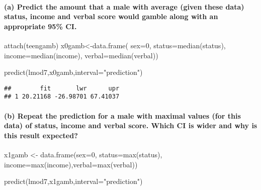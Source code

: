 \documentclass[
]{article}
\newenvironment{Shaded}{\begin{snugshade}}{\end{snugshade}}
\newcommand{\AttributeTok}[1]{\textcolor[rgb]{0.77,0.63,0.00}{#1}}
\newcommand{\DecValTok}[1]{\textcolor[rgb]{0.00,0.00,0.81}{#1}}
\newcommand{\FunctionTok}[1]{\textcolor[rgb]{0.00,0.00,0.00}{#1}}
\newcommand{\NormalTok}[1]{#1}
\newcommand{\OtherTok}[1]{\textcolor[rgb]{0.56,0.35,0.01}{#1}}
\newcommand{\StringTok}[1]{\textcolor[rgb]{0.31,0.60,0.02}{#1}}
\begin{document}
\hypertarget{a-predict-the-amount-that-a-male-with-average-given-these-data-status-income-and-verbal-score-would-gamble-along-with-an-appropriate-95-ci.}{%
\paragraph{(a) Predict the amount that a male with average (given these
data) status, income and verbal score would gamble along with an
appropriate 95\%
CI.}\label{a-predict-the-amount-that-a-male-with-average-given-these-data-status-income-and-verbal-score-would-gamble-along-with-an-appropriate-95-ci.}}

\begin{Shaded}
\begin{Highlighting}[]
\FunctionTok{attach}\NormalTok{(teengamb)}
\NormalTok{x0gamb}\OtherTok{\textless{}{-}}\FunctionTok{data.frame}\NormalTok{( }\AttributeTok{sex=}\DecValTok{0}\NormalTok{, }\AttributeTok{status=}\FunctionTok{median}\NormalTok{(status), }
                                  \AttributeTok{income=}\FunctionTok{median}\NormalTok{(income), }\AttributeTok{verbal=}\FunctionTok{median}\NormalTok{(verbal))}

\FunctionTok{predict}\NormalTok{(lmod7,x0gamb,}\AttributeTok{interval=}\StringTok{"prediction"}\NormalTok{)}
\end{Highlighting}
\end{Shaded}

\begin{verbatim}
##        fit       lwr      upr
## 1 20.21168 -26.98701 67.41037
\end{verbatim}

\hypertarget{b-repeat-the-prediction-for-a-male-with-maximal-values-for-this-data-of-status-income-and-verbal-score.-which-ci-is-wider-and-why-is-this-result-expected}{%
\paragraph{(b) Repeat the prediction for a male with maximal values (for
this data) of status, income and verbal score. Which CI is wider and why
is this result
expected?}\label{b-repeat-the-prediction-for-a-male-with-maximal-values-for-this-data-of-status-income-and-verbal-score.-which-ci-is-wider-and-why-is-this-result-expected}}

\begin{Shaded}
\begin{Highlighting}[]
\NormalTok{x1gamb }\OtherTok{\textless{}{-}} \FunctionTok{data.frame}\NormalTok{(}\AttributeTok{sex=}\DecValTok{0}\NormalTok{, }\AttributeTok{status=}\FunctionTok{max}\NormalTok{(status),}
                                            \AttributeTok{income=}\FunctionTok{max}\NormalTok{(income),}\AttributeTok{verbal=}\FunctionTok{max}\NormalTok{(verbal))}

\FunctionTok{predict}\NormalTok{(lmod7,x1gamb,}\AttributeTok{interval=}\StringTok{"prediction"}\NormalTok{)}
\end{Highlighting}
\end{Shaded}
\end{document}
